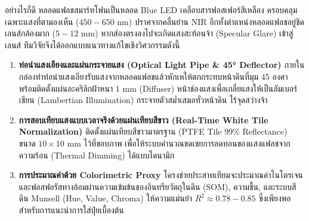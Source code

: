 \documentclass[12pt,a4paper,oneside]{book}
\begin{document}
อย่างไรก็ดี หลอดแฟลชสมาร์ทโฟนเป็นหลอด Blue LED เคลือบสารฟอสเฟอร์สีเหลือง ครอบคลุมเฉพาะแสงที่ตามองเห็น ($450 - 650\text{ nm}$) ปราศจากคลื่นย่าน NIR อีกทั้งตำแหน่งหลอดแฟลชอยู่ชิดเลนส์กล้องมาก ($5 - 12\text{ mm}$) หากส่องตรงลงไปจะเกิดแสงสะท้อนจ้า (Specular Glare) เข้าสู่เลนส์ ทีมวิจัยจึงได้ออกแบบแนวทางแก้ไขเชิงวิศวกรรมดังนี้

\begin{enumerate}
    \item \textbf{ท่อนำแสงเอียงและแผ่นกระจายแสง (Optical Light Pipe \& 45° Deflector)}
    ภายในกล่องทำท่อนำแสงเอียงรับแสงจากหลอดแฟลชแล้วหักเหให้ตกกระทบหน้าดินที่มุม 45 องศา พร้อมติดตั้งแผ่นอะคริลิกฝ้าหนา 1 mm (Diffuser) หน้าช่องแสงเพื่อเกลี่ยแสงให้เป็นลัมเบอร์เชียน (Lambertian Illumination) กระจายตัวสม่ำเสมอทั่วหน้าดิน ไร้จุดสว่างจ้า
    
    \item \textbf{การสอบเทียบแสงแบบเวลาจริงด้วยแผ่นเทียบสีขาว (Real-Time White Tile Normalization)}
    ติดตั้งแผ่นเทียบสีขาวมาตรฐาน (PTFE Tile 99\% Reflectance) ขนาด $10 \times 10\text{ mm}$ ไว้ที่ขอบภาพ เพื่อให้ระบบคำนวณชดเชยการลดทอนของแสงแฟลชจากความร้อน (Thermal Dimming) ได้แบบไดนามิก
    
    \item \textbf{การประมาณค่าด้วย Colorimetric Proxy}
    โครงข่ายประสาทเทียมจะประมาณค่าไนโตรเจนและฟอสฟอรัสทางอ้อมผ่านความเข้มข้นของอินทรียวัตถุในดิน (SOM), ความชื้น, และระบบสีดิน Munsell (Hue, Value, Chroma) ให้ความแม่นยำ $R^2 \approx 0.78 - 0.85$ ซึ่งเพียงพอสำหรับการแนะนำการใส่ปุ๋ยเบื้องต้น
\end{enumerate}
\end{document}
